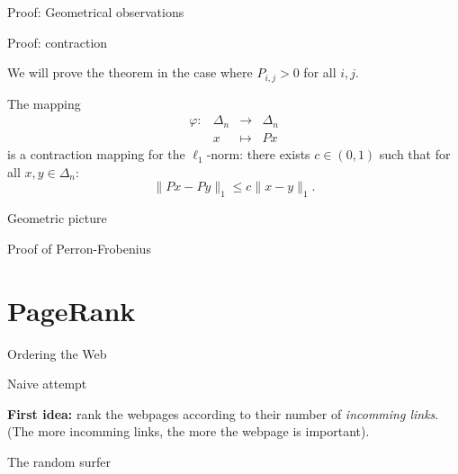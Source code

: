 \documentclass{beamer}
\begin{document}
\begin{frame}[t]{Proof: Geometrical observations}
	\grid

\end{frame}

\begin{frame}[t]{Proof: contraction}
	\grid

	\vspace{-0.3cm}
	We will prove the theorem in the case where $P_{i,j} > 0$ for all $i,j$.
	\vspace{-0.3cm}
	\begin{lemma}\label{lem:contract}
		The mapping 
		$$
		\begin{array}{cccc}
			\varphi:& \Delta_n &\to& \Delta_n \\
					& x & \mapsto & Px
		\end{array}
		$$
		is a contraction mapping for the $\ell_1$-norm: there exists $c \in (0,1)$ such that for all $x,y \in \Delta_n$:
		$$
		\| Px - Py \|_1 \leq c \| x-y\|_1.
		$$
	\end{lemma}

\end{frame}
\begin{frame}[t]{Geometric picture}
	\grid
\end{frame}
\begin{frame}[t]{Proof of Perron-Frobenius}
	\grid
	\pause
\end{frame}

\section{PageRank}
\begin{frame}[t]{Ordering the Web}
	\grid
\end{frame}

\begin{frame}[t]{Naive attempt}
	\grid

	\textbf{First idea:} rank the webpages according to their number of \emph{incomming links}. (The more incomming links, the more the webpage is important).
\end{frame}

\begin{frame}[t]{The random surfer}
	\grid
\end{frame}
\end{document}
